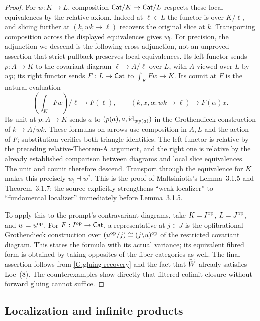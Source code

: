 \begin{proof}
For $w:K\to L$, composition $\mathsf{Cat}/K\to\mathsf{Cat}/L$ respects these
local equivalences by the relative axiom.  Indeed at $\ell\in L$
the functor is over $K/\ell$, and slicing further at
$(k,wk\to\ell)$ recovers the original slice at $k$.
Transporting composition across the displayed equivalences gives
$w_!$.  For precision, the adjunction we descend is the following
cross-adjunction, not an unproved assertion that strict pullback
preserves local equivalences.  Its left functor sends $p:A\to K$
to the covariant diagram $\ell\mapsto A/\ell$ over $L$, with $A$
viewed over $L$ by $wp$; its right functor sends $F:L\to\mathsf{Cat}$ to
$\int_K Fw\to K$.  Its counit at $F$ is the natural evaluation
\[
 (\textstyle\int_KFw)/\ell\longrightarrow F(\ell),
 \qquad(k,x,\alpha:wk\to\ell)\longmapsto F(\alpha)x.
\]
Its unit at $p:A\to K$ sends $a$ to
$(p(a),a,\mathrm{id}_{wp(a)})$ in the Grothendieck construction of
$k\mapsto A/wk$.  These formulas on arrows use composition in $A,L$
and the action of $F$; substitution verifies both triangle identities.
The left functor is relative by the preceding relative-Theorem-A
argument, and the right one is relative by the already established
comparison between diagrams and local slice equivalences.  The
unit and counit therefore descend.  Transport through the equivalence
for $K$ makes this precisely $w_!\dashv w^*$.
This is the proof of Maltsiniotis's Lemma~3.1.5 and
Theorem~3.1.7; the source explicitly strengthens ``weak localizer''
to ``fundamental localizer'' immediately before Lemma~3.1.5.

To apply this to the prompt's contravariant diagrams, take
$K=I^{\mathrm{op}}$, $L=J^{\mathrm{op}}$, and $w=u^{\mathrm{op}}$.
For $F:I^{\mathrm{op}}\to\mathsf{Cat}$, a representative at $j\in J$ is the
opfibrational Grothendieck construction over
$(u^{\mathrm{op}}/j)\cong(j\backslash u)^{\mathrm{op}}$ of the restricted
covariant diagram.  This states the formula with its actual variance;
its equivalent fibred form is obtained by taking opposites of the
fiber categories as well.  The final assertion follows from
\ref{G:gluing-recovery} and the fact that $\widetilde W$ already satisfies
Loc~(8).  The counterexamples show directly that filtered-colimit
closure without forward gluing cannot suffice.
\end{proof}

\subsection{Localization and infinite products}

